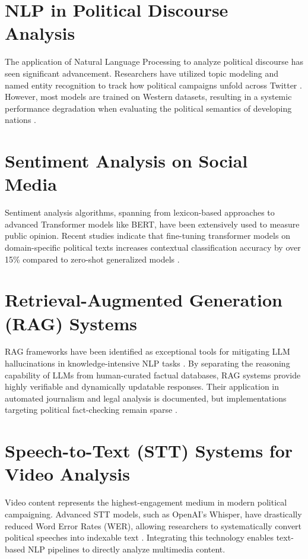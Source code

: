 \documentclass[12pt,a4paper]{report}
\begin{document}
\section{NLP in Political Discourse Analysis}
The application of Natural Language Processing to analyze political discourse has seen significant advancement. Researchers have utilized topic modeling and named entity recognition to track how political campaigns unfold across Twitter \cite{daniel2019}. However, most models are trained on Western datasets, resulting in a systemic performance degradation when evaluating the political semantics of developing nations \cite{joshi2020}.

\section{Sentiment Analysis on Social Media}
Sentiment analysis algorithms, spanning from lexicon-based approaches to advanced Transformer models like BERT, have been extensively used to measure public opinion. Recent studies indicate that fine-tuning transformer models on domain-specific political texts increases contextual classification accuracy by over 15\% compared to zero-shot generalized models \cite{kaliyar2020}.

\section{Retrieval-Augmented Generation (RAG) Systems}
RAG frameworks have been identified as exceptional tools for mitigating LLM hallucinations in knowledge-intensive NLP tasks \cite{lewis2020}. By separating the reasoning capability of LLMs from human-curated factual databases, RAG systems provide highly verifiable and dynamically updatable responses. Their application in automated journalism and legal analysis is documented, but implementations targeting political fact-checking remain sparse \cite{akhtar2021}.

\section{Speech-to-Text (STT) Systems for Video Analysis}
Video content represents the highest-engagement medium in modern political campaigning. Advanced STT models, such as OpenAI's Whisper, have drastically reduced Word Error Rates (WER), allowing researchers to systematically convert political speeches into indexable text \cite{radford2023}. Integrating this technology enables text-based NLP pipelines to directly analyze multimedia content.
\end{document}
